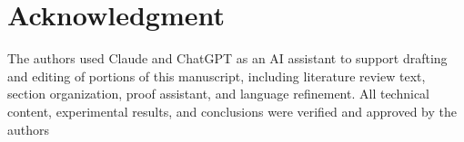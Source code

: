 \documentclass[journal]{IEEEtran}
\begin{document}
\section*{Acknowledgment}
The authors used Claude and ChatGPT as an AI assistant to support drafting and editing of portions of this manuscript, including literature review text, section organization, proof assistant, and language refinement. All technical content, experimental results, and conclusions were verified and approved by the authors




% 





\end{document}
